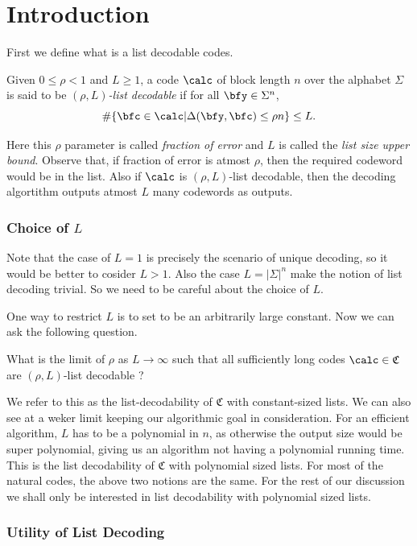 	\section{Introduction}
	First we define what is a list decodable codes.
	\begin{definition}{}{}
		Given $0 \leq \rho <1$ and $L\geq1$, a code $\calc$ of block length $n$ over the alphabet $\Sigma$ is said to be $(\rho, L)$\emph{-list decodable} if for all $\bfy\in\Sigma^n$,
		\[
		\#\{\bfc\in\calc | \Delta(\bfy,\bfc)\leq\rho n\} \leq L.
		\]
	\end{definition}	
	Here this $\rho$ parameter is called \emph{fraction of error} and $L$ is called the \emph{list size upper bound}. Observe that, if fraction of error is atmost $\rho$, then the required codeword would be in the list. Also if $\calc$ is $(\rho, L)$-list decodable, then the decoding algortithm outputs atmost $L$ many codewords as outputs.
	
	\subsubsection*{Choice of $L$}
	Note that the case of $L=1$ is precisely the scenario of unique decoding, so it would be better to cosider $L>1$. Also the case $L=|\Sigma|^n$ make the notion of list decoding trivial. So we need to be careful about the choice of $L$.
	
	One way to restrict $L$ is to set to be an arbitrarily large constant. Now we can ask the following question.
	
	\begin{question}{}{}
		What is the limit of $\rho$ as $L\to\infty$ such that all sufficiently long codes $\calc\in\mathfrak{C}$ are $(\rho, L)$-list decodable ?
	\end{question}
	We refer to this as the list-decodability of $\mathfrak{C}$ with constant-sized lists. We can also see at a weker limit keeping our algorithmic goal in consideration. For an efficient algorithm, $L$ has to be a polynomial in $n$, as otherwise the output size would be super polynomial, giving us an algorithm not having a polynomial running time. This is the list decodability of $\mathfrak{C}$ with polynomial sized lists. For most of the natural codes, the above two notions are the same. For the rest of our discussion we shall only be interested in list decodability with polynomial sized lists.
	
	\subsubsection*{Utility of List Decoding}
	
